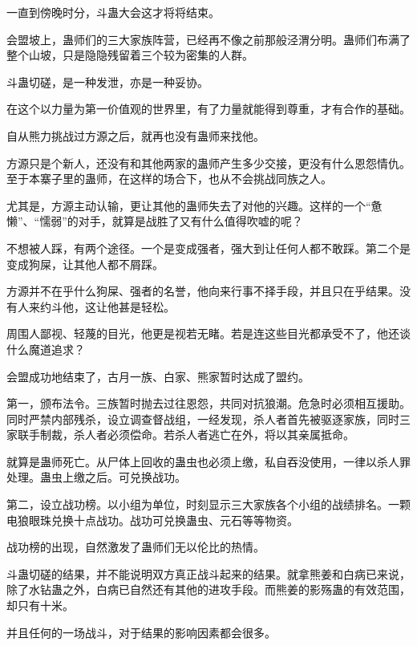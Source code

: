 
\begin{this_body}



一直到傍晚时分，斗蛊大会这才将将结束。

会盟坡上，蛊师们的三大家族阵营，已经再不像之前那般泾渭分明。蛊师们布满了整个山坡，只是隐隐残留着三个较为密集的人群。

斗蛊切磋，是一种发泄，亦是一种妥协。

在这个以力量为第一价值观的世界里，有了力量就能得到尊重，才有合作的基础。

自从熊力挑战过方源之后，就再也没有蛊师来找他。

方源只是个新人，还没有和其他两家的蛊师产生多少交接，更没有什么恩怨情仇。至于本寨子里的蛊师，在这样的场合下，也从不会挑战同族之人。

尤其是，方源主动认输，更让其他的蛊师失去了对他的兴趣。这样的一个“惫懒”、“懦弱”的对手，就算是战胜了又有什么值得吹嘘的呢？

不想被人踩，有两个途径。一个是变成强者，强大到让任何人都不敢踩。第二个是变成狗屎，让其他人都不屑踩。

方源并不在乎什么狗屎、强者的名誉，他向来行事不择手段，并且只在乎结果。没有人来约斗他，这让他甚是轻松。

周围人鄙视、轻蔑的目光，他更是视若无睹。若是连这些目光都承受不了，他还谈什么魔道追求？

会盟成功地结束了，古月一族、白家、熊家暂时达成了盟约。

第一，颁布法令。三族暂时抛去过往恩怨，共同对抗狼潮。危急时必须相互援助。同时严禁内部残杀，设立调查督战组，一经发现，杀人者首先被驱逐家族，同时三家联手制裁，杀人者必须偿命。若杀人者逃亡在外，将以其亲属抵命。

就算是蛊师死亡。从尸体上回收的蛊虫也必须上缴，私自吞没使用，一律以杀人罪处理。蛊虫上缴之后。可兑换战功。

第二，设立战功榜。以小组为单位，时刻显示三大家族各个小组的战绩排名。一颗电狼眼珠兑换十点战功。战功可兑换蛊虫、元石等等物资。

战功榜的出现，自然激发了蛊师们无以伦比的热情。

斗蛊切磋的结果，并不能说明双方真正战斗起来的结果。就拿熊姜和白病已来说，除了水钻蛊之外，白病已自然还有其他的进攻手段。而熊姜的影殇蛊的有效范围，却只有十米。

并且任何的一场战斗，对于结果的影响因素都会很多。


\end{this_body}
